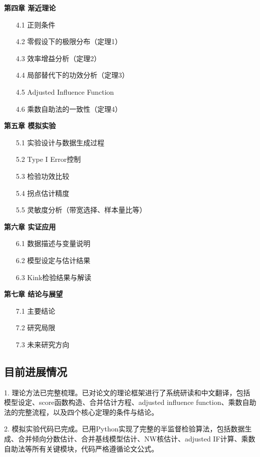 \documentclass[12pt,a4paper]{ctexart}
\begin{document}
\textbf{第四章 渐近理论}
\begin{itemize}[leftmargin=2em]
\item[4.1] 正则条件
\item[4.2] 零假设下的极限分布（定理1）
\item[4.3] 效率增益分析（定理2）
\item[4.4] 局部替代下的功效分析（定理3）
\item[4.5] Adjusted Influence Function
\item[4.6] 乘数自助法的一致性（定理4）
\end{itemize}

\textbf{第五章 模拟实验}
\begin{itemize}[leftmargin=2em]
\item[5.1] 实验设计与数据生成过程
\item[5.2] Type I Error控制
\item[5.3] 检验功效比较
\item[5.4] 拐点估计精度
\item[5.5] 灵敏度分析（带宽选择、样本量比等）
\end{itemize}

\textbf{第六章 实证应用}
\begin{itemize}[leftmargin=2em]
\item[6.1] 数据描述与变量说明
\item[6.2] 模型设定与估计结果
\item[6.3] Kink检验结果与解读
\end{itemize}

\textbf{第七章 结论与展望}
\begin{itemize}[leftmargin=2em]
\item[7.1] 主要结论
\item[7.2] 研究局限
\item[7.3] 未来研究方向
\end{itemize}

\subsection{目前进展情况}

1. 理论方法已完整梳理。已对论文的理论框架进行了系统研读和中文翻译，包括模型设定、score函数构造、合并估计方程、adjusted influence function、乘数自助法的完整流程，以及四个核心定理的条件与结论。

2. 模拟实验代码已完成。已用Python实现了完整的半监督检验算法，包括数据生成、合并倾向分数估计、合并基线模型估计、NW核估计、adjusted IF计算、乘数自助法等所有关键模块，代码严格遵循论文公式。
\end{document}
